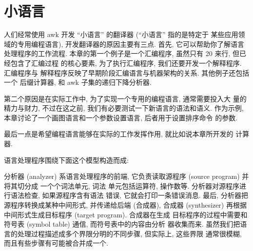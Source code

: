 \chapter{小语言}
\label{chap:little_languages}

人们经常使用 awk 开发 ``小语言'' 的翻译器 (``小语言'' 指的是特定于
某些应用领域的专用编程语言), 
开发翻译器的原因主要有三点. 首先, 它可以帮助你了解语言处理程序的工作流程.
本章的第一个例子是一个汇编程序, 虽然只有 20 来行, 但已经包含了汇编过程
的核心要素, 为了执行汇编程序, 我们还要开发一个解释程序. 汇编程序与
解释程序反映了早期阶段汇编语言与机器架构的关系. 其他例子还包括一个
后缀计算器, 和 awk 子集的递归下降分析器.

第二个原因是在实际工作中, 为了实现一个专用的编程语言, 通常需要投入大
量的精力与财力, 不过在这之前, 我们有必要测试一下新语言的语法和语义. 
作为示例, 本章讨论了一个画图语言和一个参数设置语言, 后者用于设置排序命令
的参数.

最后一点是希望编程语言能够在实际的工作发挥作用, 就比如说本章所开发的
计算器.

语言处理程序围绕下面这个模型构造而成:
\begin{center}
\end{center}

分析器 (analyzer) 系语言处理程序的前端, 它负责读取源程序 (source program)
并将其切分成 一个个词法单元, 词法
单元包括运算符, 操作数等. 分析器对源程序进行语法检查, 如果源程序含有语法
错误, 它就会打印一条错误消息. 最后, 分析器把源程序转换成某种中间形式,
并传递给后端 (合成器), 合成器 (synthesizer) 再根据中间形式生成目标程序
(target program). 合成器在生成
目标程序的过程中需要和符号表 (symbol table) 通信, 而符号表中的内容由分析
器收集而来.
虽然我们把语言的处理过程描述成多个界限分明的不同步骤, 但实际上, 这些界限
通常很模糊, 而且有些步骤有可能被合并成一个.

